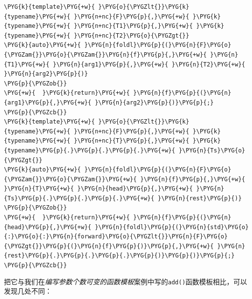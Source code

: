 \begin{codeblockbg}
\begin{Verbatim}[commandchars=\\\{\},breaklines=true,breakanywhere=true,fontsize=\codefont,xleftmargin=17bp]
\PYG{k}{template}\PYG{+w}{ }\PYG{o}{\PYGZlt{}}\PYG{k}{typename}\PYG{+w}{ }\PYG{n+nc}{F}\PYG{p}{,}\PYG{+w}{ }\PYG{k}{typename}\PYG{+w}{ }\PYG{n+nc}{T1}\PYG{p}{,}\PYG{+w}{ }\PYG{k}{typename}\PYG{+w}{ }\PYG{n+nc}{T2}\PYG{o}{\PYGZgt{}}
\PYG{k}{auto}\PYG{+w}{ }\PYG{n}{foldl}\PYG{p}{(}\PYG{n}{F}\PYG{o}{\PYGZam{}}\PYG{o}{\PYGZam{}}\PYG{n}{f}\PYG{p}{,}\PYG{+w}{ }\PYG{n}{T1}\PYG{+w}{ }\PYG{n}{arg1}\PYG{p}{,}\PYG{+w}{ }\PYG{n}{T2}\PYG{+w}{ }\PYG{n}{arg2}\PYG{p}{)}
\PYG{p}{\PYGZob{}}
\PYG{+w}{  }\PYG{k}{return}\PYG{+w}{ }\PYG{n}{f}\PYG{p}{(}\PYG{n}{arg1}\PYG{p}{,}\PYG{+w}{ }\PYG{n}{arg2}\PYG{p}{)}\PYG{p}{;}
\PYG{p}{\PYGZcb{}}
\PYG{k}{template}\PYG{+w}{ }\PYG{o}{\PYGZlt{}}\PYG{k}{typename}\PYG{+w}{ }\PYG{n+nc}{F}\PYG{p}{,}\PYG{+w}{ }\PYG{k}{typename}\PYG{+w}{ }\PYG{n+nc}{T}\PYG{p}{,}\PYG{+w}{ }\PYG{k}{typename}\PYG{p}{.}\PYG{p}{.}\PYG{p}{.}\PYG{+w}{ }\PYG{n}{Ts}\PYG{o}{\PYGZgt{}}
\PYG{k}{auto}\PYG{+w}{ }\PYG{n}{foldl}\PYG{p}{(}\PYG{n}{F}\PYG{o}{\PYGZam{}}\PYG{o}{\PYGZam{}}\PYG{+w}{ }\PYG{n}{f}\PYG{p}{,}\PYG{+w}{ }\PYG{n}{T}\PYG{+w}{ }\PYG{n}{head}\PYG{p}{,}\PYG{+w}{ }\PYG{n}{Ts}\PYG{p}{.}\PYG{p}{.}\PYG{p}{.}\PYG{+w}{ }\PYG{n}{rest}\PYG{p}{)}
\PYG{p}{\PYGZob{}}
\PYG{+w}{  }\PYG{k}{return}\PYG{+w}{ }\PYG{n}{f}\PYG{p}{(}\PYG{n}{head}\PYG{p}{,}\PYG{+w}{ }\PYG{n}{foldl}\PYG{p}{(}\PYG{n}{std}\PYG{o}{:}\PYG{o}{:}\PYG{n}{forward}\PYG{o}{\PYGZlt{}}\PYG{n}{F}\PYG{o}{\PYGZgt{}}\PYG{p}{(}\PYG{n}{f}\PYG{p}{)}\PYG{p}{,}\PYG{+w}{ }\PYG{n}{rest}\PYG{p}{.}\PYG{p}{.}\PYG{p}{.}\PYG{p}{)}\PYG{p}{)}\PYG{p}{;}
\PYG{p}{\PYGZcb{}}
\end{Verbatim}
\end{codeblockbg}



把它与我们在\textit{编写参数个数可变的函数模板}案例中写的\texttt{add()}函数模板相比，可以发现几处不同：



